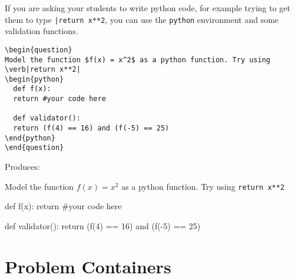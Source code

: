 \documentclass{ximera}
\begin{document}
\begin{example}
If you are asking your students to write python code, for example trying to get them to type \verb!|return x**2!, you can use the \verb!python! environment and some validation functions.

\begin{verbatim}
\begin{question}
Model the function $f(x) = x^2$ as a python function. Try using \verb|return x**2|
\begin{python}
  def f(x):
  return #your code here

  def validator():
  return (f(4) == 16) and (f(-5) == 25)
\end{python}
\end{question}
\end{verbatim}

Produces:

\begin{question}
Model the function $f(x) = x^2$ as a python function. Try using \verb|return x**2|
\begin{python}
  def f(x):
  return #your code here

  def validator():
  return (f(4) == 16) and (f(-5) == 25)
\end{python}
\end{question}
\end{example}


\section{Problem Containers} \label{ProblemContainers}
\end{document}
